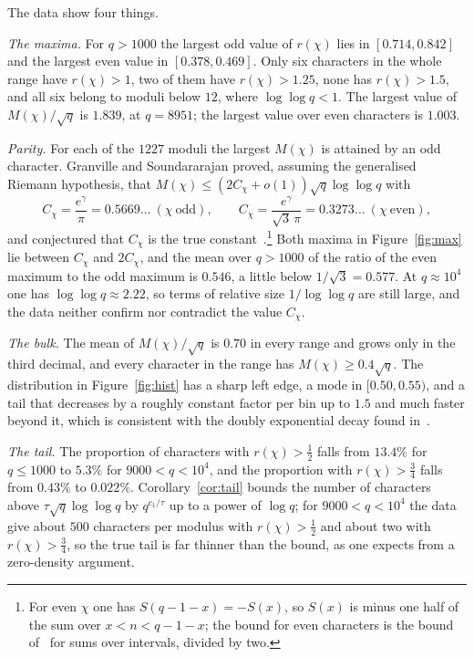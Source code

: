\documentclass[11pt,a4paper,reqno]{amsart}
\theoremstyle{remark}
\numberwithin{equation}{section}
\begin{document}
The data show four things.

\emph{The maxima.} For $q>1000$ the largest odd value of $r(\chi)$ lies in $[0.714,0.842]$ and the largest even value in $[0.378,0.469]$. Only six characters in the whole range have $r(\chi)>1$, two of them have $r(\chi)>1.25$, none has $r(\chi)>1.5$, and all six belong to moduli below $12$, where $\log\log q<1$. The largest value of $M(\chi)/\sqrt q$ is $1.839$, at $q=8951$; the largest value over even characters is $1.003$.

\emph{Parity.} For each of the $1227$ moduli the largest $M(\chi)$ is attained by an odd character. Granville and Soundararajan proved, assuming the generalised Riemann hypothesis, that $M(\chi)\le(2C_\chi+o(1))\sqrt q\log\log q$ with
\[
  C_\chi=\frac{e^\gamma}{\pi}=0.5669\ldots\ (\chi\ \text{odd}),\qquad C_\chi=\frac{e^\gamma}{\sqrt3\,\pi}=0.3273\ldots\ (\chi\ \text{even}),
\]
and conjectured that $C_\chi$ is the true constant~\cite[Theorem~6 and Conjecture~1]{GS07}.\footnote{For even $\chi$ one has $S(q-1-x)=-S(x)$, so $S(x)$ is minus one half of the sum over $x<n<q-1-x$; the bound for even characters is the bound of~\cite{GS07} for sums over intervals, divided by two.} Both maxima in Figure~\ref{fig:max} lie between $C_\chi$ and $2C_\chi$, and the mean over $q>1000$ of the ratio of the even maximum to the odd maximum is $0.546$, a little below $1/\sqrt3=0.577$. At $q\approx10^4$ one has $\log\log q\approx2.22$, so terms of relative size $1/\log\log q$ are still large, and the data neither confirm nor contradict the value $C_\chi$.

\emph{The bulk.} The mean of $M(\chi)/\sqrt q$ is $0.70$ in every range and grows only in the third decimal, and every character in the range has $M(\chi)\ge0.4\sqrt q$. The distribution in Figure~\ref{fig:hist} has a sharp left edge, a mode in $[0.50,0.55)$, and a tail that decreases by a roughly constant factor per bin up to $1.5$ and much faster beyond it, which is consistent with the doubly exponential decay found in~\cite{BGGK18}.

\emph{The tail.} The proportion of characters with $r(\chi)>\tfrac12$ falls from $13.4\%$ for $q\le1000$ to $5.3\%$ for $9000<q<10^4$, and the proportion with $r(\chi)>\tfrac34$ falls from $0.43\%$ to $0.022\%$. Corollary~\ref{cor:tail} bounds the number of characters above $\tau\sqrt q\log\log q$ by $q^{c_1/\tau}$ up to a power of $\log q$; for $9000<q<10^4$ the data give about $500$ characters per modulus with $r(\chi)>\tfrac12$ and about two with $r(\chi)>\tfrac34$, so the true tail is far thinner than the bound, as one expects from a zero-density argument.
\end{document}
